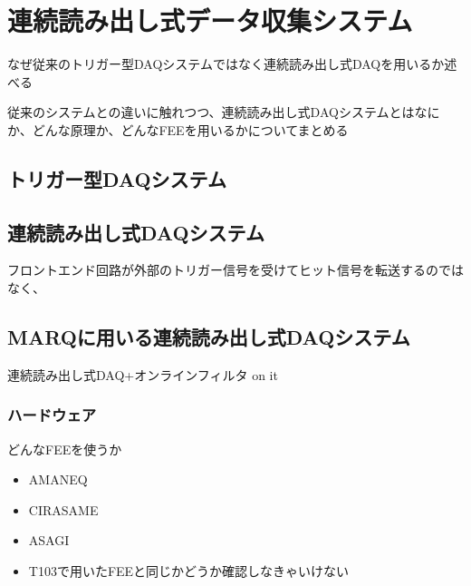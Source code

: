 \documentclass[../main.tex]{subfiles}
\begin{document}
\section{連続読み出し式データ収集システム}
\label{sec:background}
なぜ従来のトリガー型DAQシステムではなく連続読み出し式DAQを用いるか述べる

従来のシステムとの違いに触れつつ、連続読み出し式DAQシステムとはなにか、どんな原理か、どんなFEEを用いるかについてまとめる
\subsection{トリガー型DAQシステム}
\subsection{連続読み出し式DAQシステム}
フロントエンド回路が外部のトリガー信号を受けてヒット信号を転送するのではなく、
\subsection{MARQに用いる連続読み出し式DAQシステム}
連続読み出し式DAQ+オンラインフィルタ on it
\subsubsection{ハードウェア}
どんなFEEを使うか
\begin{tcolorbox}[
  title=執筆メモ,
  colback=yellow!8,
  colframe=black!30,
  breakable
]
\begin{itemize}
  \item AMANEQ
  \item CIRASAME
  \item ASAGI
  \item T103で用いたFEEと同じかどうか確認しなきゃいけない
\end{itemize}
\end{tcolorbox}
\end{document}

